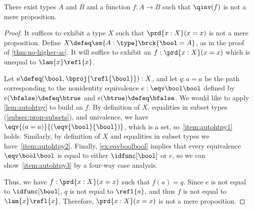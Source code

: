 %
\begin{thm}\label{thm:qinv-notprop}
  There exist types $A$ and $B$ and a function $f:A\to B$ such that $\qinv(f)$ is not a mere proposition.
\end{thm}

\begin{proof}
  It suffices to exhibit a type $X$ such that $\prd{x:X} (x=x)$ is not a mere proposition.
  Define $X\defeq \sm{A:\type} \brck{\bool=A}$, as in the proof of \cref{thm:no-higher-ac}.
  It will suffice to exhibit an $f:\prd{x:X} (x=x)$ which is unequal to $\lam{x} \refl{x}$.

  Let $a \defeq (\bool,\bproj{\refl{\bool}}) : X$, and let $q:a=a$ be the path corresponding to the nonidentity equivalence $e:\eqv\bool\bool$ defined by $e(\bfalse)\defeq\btrue$ and $e(\btrue)\defeq\bfalse$.
  We would like to apply \cref{lem:autohtpy} to build an $f$.
  By definition of $X$, equalities in subset types (\cref{subsec:prop-subsets}), and univalence, we have $\eqv{(a=a)}{(\eqv{\bool}{\bool})}$, which is a set, so~\ref{item:autohtpy1} holds.
  Similarly, by definition of $X$ and equalities in subset types we have~\ref{item:autohtpy2}.
  Finally, \cref{ex:eqvboolbool} implies that every equivalence $\eqv\bool\bool$ is equal to either $\idfunc[\bool]$ or $e$, so we can show~\ref{item:autohtpy3} by a four-way case analysis.

  Thus, we have $f:\prd{x:X} (x=x)$ such that $f(a) = q$.
  Since $e$ is not equal to $\idfunc[\bool]$, $q$ is not equal to $\refl{a}$, and thus $f$ is not equal to $\lam{x} \refl{x}$.
  Therefore, $\prd{x:X} (x=x)$ is not a mere proposition.
\end{proof}
